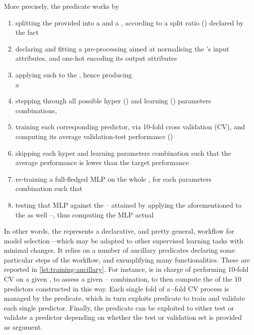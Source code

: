 \documentclass[12pt,a4paper,openright,twoside]{book}
\begin{document}
More precisely, the predicate  works by
%
\begin{enumerate}
    \item splitting the provided  into a  and a , according to a split ratio () declared by the  fact
    \item declaring and fitting a pre-processing  aimed at normalising the 's input attributes, and one-hot encoding its output attributes
    \item applying such  to the , hence producing
    \\
    a 
    \item stepping through all possible hyper () and learning () parameters combinations,
    \item training each corresponding predictor, via 10-fold cross validation (CV), and computing its average validation-test performance ()
    \item skipping each hyper and learning parameters combination such that the average performance  is lower than the target performance 
    \item re-training a full-fledged MLP on the whole , for each parameters combination such that 
    \item testing that MLP against the  -- attained by applying the aforementioned  to the  as well --, thus computing the MLP actual 
\end{enumerate}
%
In other words, the  represents a declarative, and pretty general, workflow for model selection---which may be adapted to other supervised learning tasks with minimal changes.
%
It relies on a number of ancillary predicates declaring some particular steps of the workflow, and exemplifying many \mllib{} functionalities.
%
These are reported in \cref{lst:training-ancillary}.
%
For instance,  is in charge of performing 10-fold CV on a given , to assess a given -- combination, to then compute the  of the 10 predictors constructed in this way.
%
Each single fold of a -fold CV process is managed by the  predicate, which in turn exploits  predicate to train and validate each single predictor.
%
Finally, the  predicate can be exploited to either test or validate a predictor depending on whether the test or validation set is provided as argument.
\end{document}
